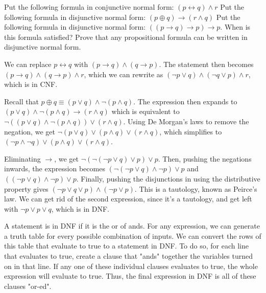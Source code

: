 \documentclass[solution, letterpaper]{cs20}
\begin{document}




\subproblem Put the following formula in conjunctive normal form: $(p \leftrightarrow q) \land r$
\subproblem Put the following formula in disjunctive normal form: $(p \oplus q) \rightarrow (r \land q)$
\subproblem Put the following formula in disjunctive normal form: $((p \rightarrow q) \rightarrow p) \rightarrow p$. When is this formula satisfied?
\subproblem Prove that any propositional formula can be written in disjunctive normal form. 

\begin{solution}
\subsolution  We can replace $p \leftrightarrow q$ with $(p \rightarrow q) \land (q \rightarrow p)$. The statement then becomes $(p \rightarrow q) \land (q \rightarrow p) \land r$, which we can rewrite as $(\lnot p \lor q) \land (\lnot q \lor p) \land r$, which is in CNF.

\subsolution Recall that $p \oplus q \equiv (p \lor q) \land \lnot (p \land q)$. The expression then expands to $(p \lor q) \land \lnot (p \land q) \rightarrow (r \land q)$ which is equivalent to $\lnot((p \lor q) \land \lnot (p \land q)) \lor (r \land q)$. Using De Morgan's laws to remove the negation, we get $\lnot (p \lor q) \lor (p \land q) \lor (r \land q)$, which simplifies to $(\lnot p \land \lnot q) \lor (p \land q) \lor (r \land q)$.

\subsolution Eliminating $\rightarrow$, we get $\lnot (\lnot (\lnot p \lor q) \lor p) \lor p$. Then, pushing the negations inwards, the expression becomes $(\lnot (\lnot p \lor q) \land \lnot p) \lor p$ and $((\lnot p \lor q) \land \lnot p) \lor p$. Finally, pushing the disjunctions in using the distributive property gives $(\lnot p \lor q \lor p) \land (\lnot p \lor p)$. This is a tautology, known as Peirce's law. We can get rid of the second expression, since it's a tautology, and get left with $\lnot p \lor p \lor q$, which is in DNF.

\subsolution A statement is in DNF if it is the or of ands. For any expression, we can generate a truth table for every possible combination of inputs. We can convert the rows of this table that evaluate to true to a statement in DNF. To do so, for each line that evaluates to true, create a clause that "ands" together the variables turned on in that line. If any one of these individual clauses evaluates to true, the whole expression will evaluate to true. Thus, the final expression in DNF is all of these clauses "or-ed". 

\end{solution}
\end{document}
